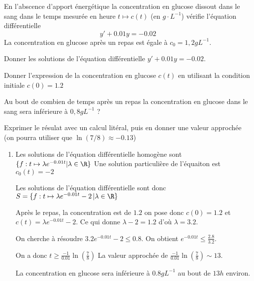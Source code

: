 


\begin{exercice}
En l'abscence d'apport énergétique la concentration en glucose dissout dans le sang dans le temps mesurée en heure  $t\mapsto c(t)$   (en $g\cdot L^{-1}$) vérifie l'équation différentielle $$y'+0.01y= -0.02$$
La concentration en glucose après un repas est égale à $c_0=1,2gL^{-1}$.

Donner les solutions de l'équation différentielle $y'+0.01y= -0.02$.

Donner l'expression de la concentration en glucose $c(t)$ en utilisant la condition initiale $c(0) =1.2$

Au bout de combien de temps après un repas la concentration en glucose dans le sang sera inférieure à $0,8gL^{-1}$ ? 

Exprimer le résulat avec un calcul litéral, puis en donner une valeur approchée (on pourra utiliser que $\ln(7/8)  \approx -0.13$)

\end{exercice}

\begin{correction}
\begin{enumerate}
\item Les solutions de l'équation différentielle homogène sont $\{ f : t\mapsto \lambda e^{-0.01t} |\lambda\in \R\}$
Une solution particulière de l'équaiton est $c_0(t) = -2$ 

Les solutions de l'équation différentielle sont donc $S=\{ f : t\mapsto \lambda e^{-0.01t} - 2\, | \lambda\in \R\}$

Après le repas, la concentration est de $1.2$ on pose donc $c(0)=1.2$ et $c(t) =  \lambda e^{-0.01t} - 2$. Ce qui donne $\lambda -2 = 1.2 $ d'où $\lambda=3.2$. 


On cherche à résoudre $3.2e^{-0.01t} -2 \leq 0.8$. On obtient 
$e^{-0.01t} \leq \frac{2.8}{3.2}$.

On a donc $t\geq \frac{-1}{0.01}\ln(\frac{7}{8})$
La valeur approchée de $\frac{-1}{0.01}\ln(\frac{7}{8})\sim 13$. 

La concentration en glucose sera inférieure à $0.8gL^{-1}$ au bout de $13h$ environ. 



\end{enumerate}
\end{correction}